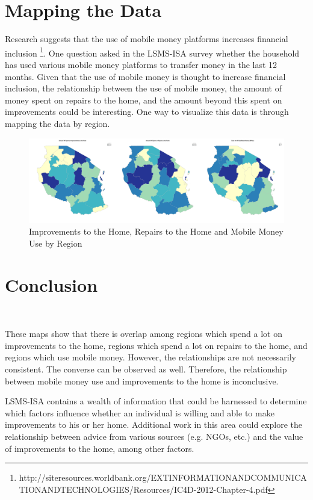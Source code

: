\documentclass[11pt]{article}
\begin{document}
\section{Mapping the Data}\label{map}
  Research suggests that the use of mobile money platforms increases financial inclusion \footnote{http://siteresources.worldbank.org/EXTINFORMATIONANDCOMMUNICATIONANDTECHNOLOGIES/Resources/IC4D-2012-Chapter-4.pdf}. One question asked in the LSMS-ISA survey whether the household has used various mobile money platforms to transfer money in the last 12 months. Given that the use of mobile money is thought to increase financial inclusion, the relationship between the use of mobile money, the amount of money spent on repairs to the home, and the amount beyond this spent on improvements could be interesting. One way to visualize this data is through mapping the data by region. 
  

\begin{figure}[h]
\centering
\includegraphics{PUBPOL599B_Final_Project_Exec-location}
\caption{Improvements to the Home, Repairs to the Home and Mobile Money Use by Region}
\end{figure}

\section{Conclusion}\

  These maps show that there is overlap among regions which spend a lot on improvements to the home, regions which spend a lot on repairs to the home, and regions which use mobile money. However, the relationships are not necessarily consistent. The converse can be observed as well. Therefore, the relationship between mobile money use and improvements to the home is inconclusive. 

  LSMS-ISA contains a wealth of information that could be harnessed to determine which factors influence whether an individual is willing and able to make improvements to his or her home. Additional work in this area could explore the relationship between advice from various sources (e.g. NGOs, etc.) and the value of improvements to the home, among other factors.  
  
\end{document}
